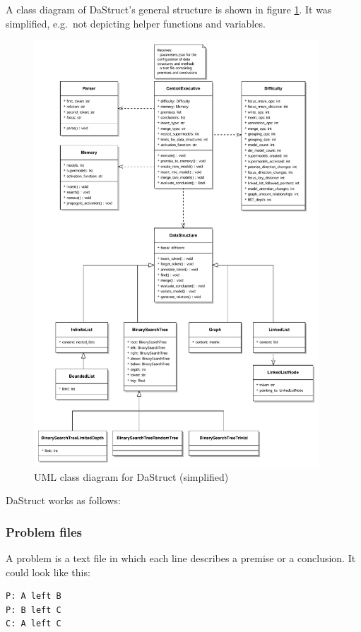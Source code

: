 \documentclass[hidelinks]{scrartcl}
\begin{document}
A class diagram of DaStruct's general structure is shown in figure \ref{img:UML}. It was simplified, e.g.\ not depicting helper functions and variables.
\begin{figure}[H]
	\caption{UML class diagram for DaStruct (simplified)}
	\label{img:UML}
	\centering
	\includegraphics[width=0.95\textwidth]{Illustrations/UML_class_diagram_DaStruct.pdf}
\end{figure}

\noindent DaStruct works as follows: 

\subsubsection{Problem files}
A problem is a text file in which each line describes a \gls{premise} or a conclusion. It could look like this: 

\begin{lstlisting}[caption=A sample problem file, frame=single]
P: A left B
P: B left C
C: A left C
\end{lstlisting} 
\end{document}
